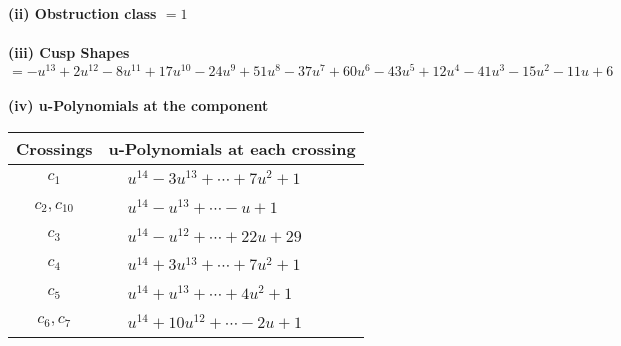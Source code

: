 \documentclass[1p]{elsarticle_modified}
\theoremstyle{definition}
\begin{document}
\flushleft \textbf{(ii) Obstruction class $= 1$}\\~\\
\flushleft \textbf{(iii) Cusp Shapes $= - u^{13}+2 u^{12}-8 u^{11}+17 u^{10}-24 u^9+51 u^8-37 u^7+60 u^6-43 u^5+12 u^4-41 u^3-15 u^2-11 u+6$}\\~\\
\newpage\renewcommand{\arraystretch}{1}
\flushleft \textbf{(iv) u-Polynomials at the component}\newline \\
\begin{tabular}{m{50pt}|m{274pt}}
Crossings & \hspace{64pt}u-Polynomials at each crossing \\
\hline $$\begin{aligned}c_{1}\end{aligned}$$&$\begin{aligned}
&u^{14}-3 u^{13}+\cdots+7 u^2+1
\end{aligned}$\\
\hline $$\begin{aligned}c_{2},c_{10}\end{aligned}$$&$\begin{aligned}
&u^{14}- u^{13}+\cdots- u+1
\end{aligned}$\\
\hline $$\begin{aligned}c_{3}\end{aligned}$$&$\begin{aligned}
&u^{14}- u^{12}+\cdots+22 u+29
\end{aligned}$\\
\hline $$\begin{aligned}c_{4}\end{aligned}$$&$\begin{aligned}
&u^{14}+3 u^{13}+\cdots+7 u^2+1
\end{aligned}$\\
\hline $$\begin{aligned}c_{5}\end{aligned}$$&$\begin{aligned}
&u^{14}+u^{13}+\cdots+4 u^2+1
\end{aligned}$\\
\hline $$\begin{aligned}c_{6},c_{7}\end{aligned}$$&$\begin{aligned}
&u^{14}+10 u^{12}+\cdots-2 u+1
\end{aligned}$\\

\end{tabular}
\end{document}

